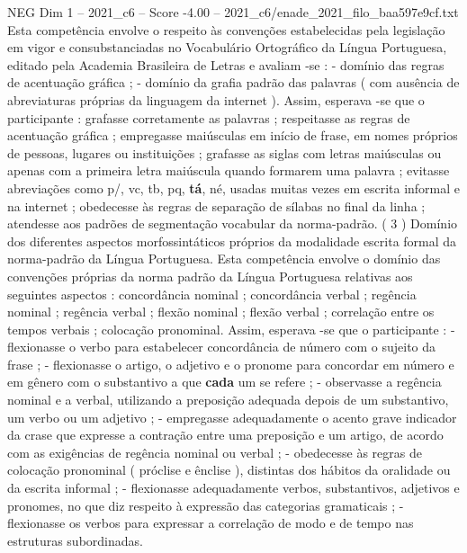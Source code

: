 \begin{textsample}{NEG Dim 1 – 2021\_c6 – Score -4.00 – 2021\_c6/enade\_2021\_filo\_baa597e9cf.txt}
Esta competência envolve o respeito às convenções estabelecidas pela legislação em vigor e consubstanciadas no Vocabulário Ortográfico da Língua Portuguesa, editado pela Academia Brasileira de Letras e avaliam -se : - domínio das regras de acentuação gráfica ; - domínio da grafia padrão das palavras ( com ausência de abreviaturas próprias da linguagem da internet ).
Assim, esperava -se que o participante : grafasse corretamente as palavras ; respeitasse as regras de acentuação gráfica ; empregasse maiúsculas em início de frase, em nomes próprios de pessoas, lugares ou instituições ; grafasse as siglas com letras maiúsculas ou apenas com a primeira letra maiúscula quando formarem uma palavra ; evitasse abreviações como p/, vc, tb, pq, \textbf{tá}, né, usadas muitas vezes em escrita informal e na internet ; obedecesse às regras de separação de sílabas no final da linha ; atendesse aos padrões de segmentação vocabular da norma-padrão. ( 3 ) Domínio dos diferentes aspectos morfossintáticos próprios da modalidade escrita formal da norma-padrão da Língua Portuguesa.
Esta competência envolve o domínio das convenções próprias da norma padrão da Língua Portuguesa relativas aos seguintes aspectos : concordância nominal ; concordância verbal ; regência nominal ; regência verbal ; flexão nominal ; flexão verbal ; correlação entre os tempos verbais ; colocação pronominal.
Assim, esperava -se que o participante : - flexionasse o verbo para estabelecer concordância de número com o sujeito da frase ; - flexionasse o artigo, o adjetivo e o pronome para concordar em número e em gênero com o substantivo a que \textbf{cada} um se refere ; - observasse a regência nominal e a verbal, utilizando a preposição adequada depois de um substantivo, um verbo ou um adjetivo ; - empregasse adequadamente o acento grave indicador da crase que expresse a contração entre uma preposição e um artigo, de acordo com as exigências de regência nominal ou verbal ; - obedecesse às regras de colocação pronominal ( próclise e ênclise ), distintas dos hábitos da oralidade ou da escrita informal ; - flexionasse adequadamente verbos, substantivos, adjetivos e pronomes, no que diz respeito à expressão das categorias gramaticais ; - flexionasse os verbos para expressar a correlação de modo e de tempo nas estruturas subordinadas.

\end{textsample}
